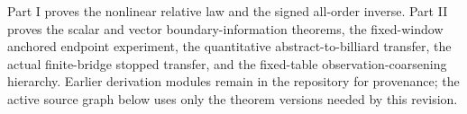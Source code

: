 Part I proves the nonlinear relative law and the signed all-order inverse.
Part II proves the scalar and vector boundary-information theorems, the
fixed-window anchored endpoint experiment, the quantitative
abstract-to-billiard transfer, the actual finite-bridge stopped transfer, and
the fixed-table observation-coarsening hierarchy.  Earlier derivation modules
remain in the repository for provenance; the active source graph below uses
only the theorem versions needed by this revision.

